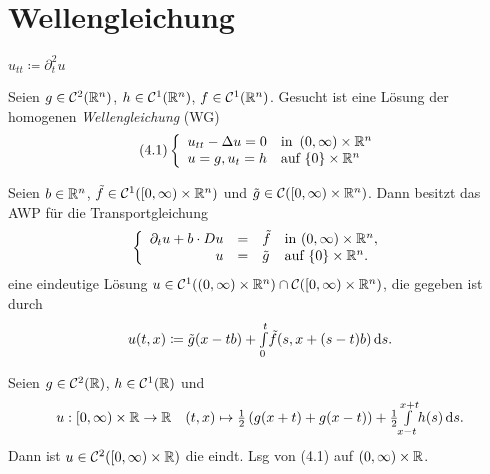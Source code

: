 \documentclass{cheat-sheet}
\begin{document}

\section{Wellengleichung}




\begin{nota}
  $u_{tt} \coloneqq \partial_t^2 u$
\end{nota}

\begin{prob}
  Seien $g \in \mathcal{C}^2(\mathbb{R}^n)$, $h \in \mathcal{C}^1(\mathbb{R}^n)$, $f \in \mathcal{C}^1(\mathbb{R}^n)$. Gesucht ist eine Lösung der homogenen \emph{Wellengleichung} (WG)
  \[
    (4.1) \left\{ \begin{array}{ll}
      u_{tt} - \Delta u = 0 & \text{in } \left( 0, \infty \right) \times \mathbb{R}^n\\
      u = g, u_t = h & \text{auf } \{ 0 \} \times \mathbb{R}^n
    \end{array} \right.
  \]
\end{prob}

\begin{satz}
  Seien $b \in \mathbb{R}^n$, $\tilde{f} \in \mathcal{C}^1(\left[ 0, \infty \right) \times \mathbb{R}^n)$ und $\tilde{g} \in \mathcal{C}(\left[ 0, \infty \right) \times \mathbb{R}^n)$. Dann besitzt das AWP für die Transportgleichung
  \[
    \left\{ \begin{array}{rlll}
      \partial_t u + b \cdot Du &=& \tilde{f} & \text{in $\left( 0, \infty \right) \times \mathbb{R}^n$},\\
      u &=& \tilde{g} & \text{auf $\{ 0 \} \times \mathbb{R}^n$}.
    \end{array} \right.
  \]
  eine eindeutige Lösung $u \in \mathcal{C}^1(\left( 0, \infty \right) \times \mathbb{R}^n) \cap \mathcal{C}(\left[ 0, \infty \right) \times \mathbb{R}^n)$, die gegeben ist durch
  \[ u(t, x) \coloneqq \tilde{g}(x - tb) + {\textstyle \int\limits_{0}^{t}} \tilde{f}(s, x + (s - t) b) \,\mathrm{d} s. \]
\end{satz}

\begin{satz}
  Seien $g \in \mathcal{C}^2(\mathbb{R})$, $h \in \mathcal{C}^1(\mathbb{R})$ und
  \[
    u : \left[ 0, \infty \right) \times \mathbb{R} \to \mathbb{R} \quad
    (t, x) \mapsto \tfrac{1}{2} \left( g(x+t) + g(x-t) \right) + \tfrac{1}{2} {\textstyle \int\limits_{x-t}^{x+t}} h(s) \,\mathrm{d} s.
  \]
  Dann ist $u \in \mathcal{C}^2(\left[ 0, \infty \right) \times \mathbb{R})$ die eindt. Lsg von (4.1) auf $\left( 0, \infty \right) \times \mathbb{R}$.
\end{satz}
\end{document}
